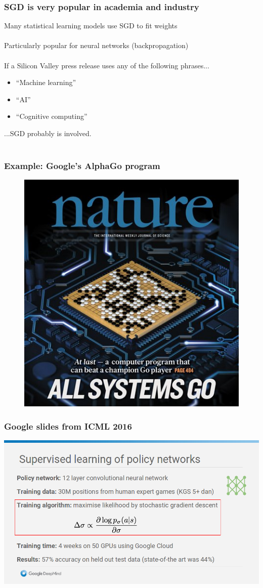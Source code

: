 \documentclass{beamer}
\begin{document}
\begin{frame}
	\frametitle{SGD is very popular in academia and industry}
	Many statistical learning models use SGD to fit weights \\~\\

	Particularly popular for neural networks (backpropagation) \\~\\

	If a Silicon Valley press release uses any of the following phrases...
	\begin{itemize}
		\item \small ``Machine learning''
		\item \small ``AI'' 
		\item \small ``Cognitive computing''
	\end{itemize}

	...SGD probably is involved. \\~\\

	
\end{frame}

\begin{frame}
	\frametitle{Example: Google's \textbf{AlphaGo} program}
	\begin{figure}[b]
	\centering
	\includegraphics[scale=0.4]{go}
	\end{figure}
\end{frame}

\begin{frame}
	\frametitle{Google slides from ICML 2016}
	\centering
	\includegraphics[scale=0.3]{screenshot}
\end{frame}
\end{document}
